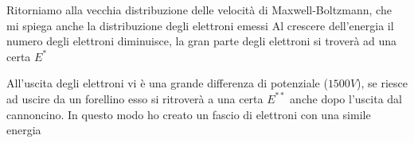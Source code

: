\documentclass{article}
\begin{document}
Ritorniamo alla vecchia distribuzione delle velocità di Maxwell-Boltzmann, che mi spiega anche la distribuzione 
degli elettroni emessi
Al crescere dell'energia il numero degli elettroni diminuisce, la gran parte degli elettroni si troverà ad una certa $E^*$

\begin{center}
\end{center}

All'uscita degli elettroni vi è una grande differenza di potenziale ($1500V$), se riesce ad uscire da un forellino esso si ritroverà 
a una certa $E^{**}$ anche dopo l'uscita dal cannoncino.
In questo modo ho creato un fascio di elettroni con una simile energia
\end{document}
